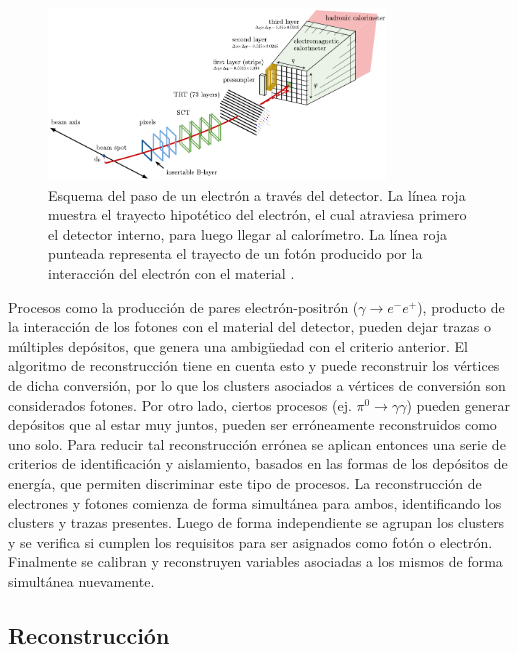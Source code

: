  \begin{figure}
   \includegraphics[width=0.8\textwidth]{images/objects/el_reco.pdf}
   \caption{Esquema del paso de un electrón a través del detector. La línea roja muestra el trayecto hipotético del electrón, el cual atraviesa primero el detector interno, para luego llegar al calorímetro. La línea roja punteada representa el trayecto de un fotón producido por la interacción del electrón con el material \cite{PERF-2017-01}.}
   \label{fig:el_reco}
 \end{figure}


Procesos como la producción de pares electrón-positrón ($\gamma\to e^{-}e^{+}$), producto de la interacción de los fotones con el material del detector, pueden dejar trazas o múltiples depósitos, que genera una ambigüedad con el criterio anterior.
El algoritmo de reconstrucción tiene en cuenta esto y puede reconstruir los vértices de dicha conversión, por lo que los clusters asociados a vértices de conversión son considerados fotones. Por otro lado, ciertos procesos (ej. $\pi^{0}\to\gamma\gamma$) pueden generar depósitos que al estar muy juntos, pueden ser erróneamente reconstruidos como uno solo.
Para reducir tal reconstrucción errónea se aplican entonces una serie de criterios de identificación y aislamiento, basados en las formas de los depósitos de energía, que permiten discriminar este tipo de procesos.
La reconstrucción de electrones y fotones comienza de forma simultánea para ambos, identificando los clusters y trazas presentes. Luego de forma independiente se agrupan los clusters y se verifica si cumplen los requisitos para ser asignados como fotón o electrón. Finalmente se calibran y reconstruyen variables asociadas a los mismos de forma simultánea nuevamente.


\subsection{Reconstrucción}


